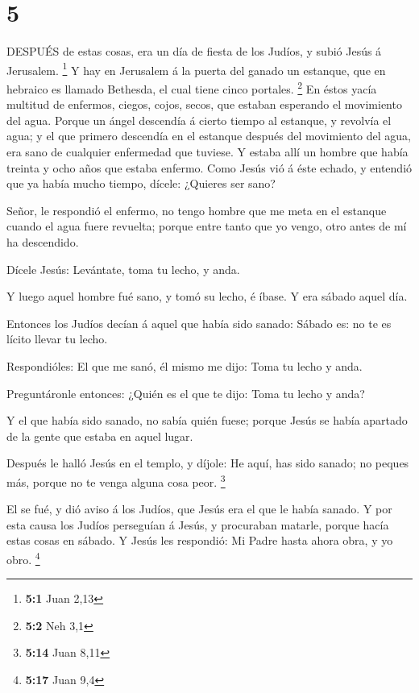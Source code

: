\hypertarget{section-4}{%
\section{5}\label{section-4}}

 DESPUÉS de estas cosas, era un día de fiesta de los Judíos,
y subió Jesús á Jerusalem. \footnote{\textbf{5:1} Juan 2,13}
 Y hay en Jerusalem á la puerta del ganado un estanque, que
en hebraico es llamado Bethesda, el cual tiene cinco portales.
\footnote{\textbf{5:2} Neh 3,1}  En éstos yacía multitud de
enfermos, ciegos, cojos, secos, que estaban esperando el movimiento del
agua.  Porque un ángel descendía á cierto tiempo al
estanque, y revolvía el agua; y el que primero descendía en el estanque
después del movimiento del agua, era sano de cualquier enfermedad que
tuviese.  Y estaba allí un hombre que había treinta y ocho
años que estaba enfermo.  Como Jesús vió á éste echado, y
entendió que ya había mucho tiempo, dícele: ¿Quieres ser sano?

 Señor, le respondió el enfermo, no tengo hombre que me meta
en el estanque cuando el agua fuere revuelta; porque entre tanto que yo
vengo, otro antes de mí ha descendido.

 Dícele Jesús: Levántate, toma tu lecho, y anda.

 Y luego aquel hombre fué sano, y tomó su lecho, é íbase. Y
era sábado aquel día.

 Entonces los Judíos decían á aquel que había sido sanado:
Sábado es: no te es lícito llevar tu lecho.

 Respondióles: El que me sanó, él mismo me dijo: Toma tu
lecho y anda.

 Preguntáronle entonces: ¿Quién es el que te dijo: Toma tu
lecho y anda?

 Y el que había sido sanado, no sabía quién fuese; porque
Jesús se había apartado de la gente que estaba en aquel lugar.

 Después le halló Jesús en el templo, y díjole: He aquí,
has sido sanado; no peques más, porque no te venga alguna cosa peor.
\footnote{\textbf{5:14} Juan 8,11}

 El se fué, y dió aviso á los Judíos, que Jesús era el que
le había sanado.  Y por esta causa los Judíos perseguían á
Jesús, y procuraban matarle, porque hacía estas cosas en sábado.
 Y Jesús les respondió: Mi Padre hasta ahora obra, y yo
obro. \footnote{\textbf{5:17} Juan 9,4}

